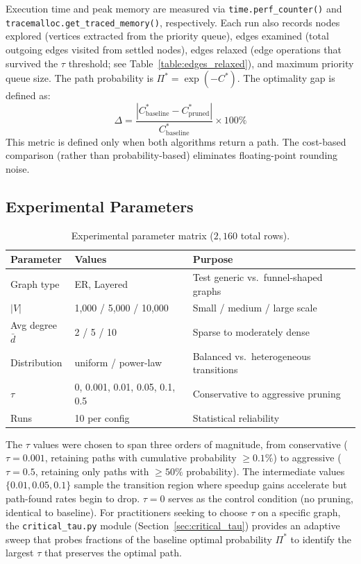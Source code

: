 Execution time and peak memory are measured via \texttt{time.perf\_counter()} and \texttt{tracemalloc.get\_traced\_memory()}, respectively.
Each run also records nodes explored (vertices extracted from the priority queue), edges examined (total outgoing edges visited from settled nodes), edges relaxed (edge operations that survived the $\tau$ threshold; see Table~\ref{table:edges_relaxed}), and maximum priority queue size.
The path probability is $\Pi^* = \exp(-C^*)$. The optimality gap is defined as:
    \[
    \Delta = \frac{|C^*_{\text{baseline}} - C^*_{\text{pruned}}|}{C^*_{\text{baseline}}} \times 100\%
    \]
    This metric is defined only when both algorithms return a path. The cost-based comparison (rather than probability-based) eliminates floating-point rounding noise.

\subsection{Experimental Parameters}

\begin{table}[htbp]
\centering
\renewcommand{\arraystretch}{1.3}
\begin{tabular}{@{}llp{7cm}@{}}
\toprule
\textbf{Parameter} & \textbf{Values} & \textbf{Purpose} \\
\midrule
Graph type & ER, Layered & Test generic vs.\ funnel-shaped graphs \\
$|V|$ & 1,000 / 5,000 / 10,000 & Small / medium / large scale \\
Avg degree $\bar{d}$ & 2 / 5 / 10 & Sparse to moderately dense \\
Distribution & uniform / power-law & Balanced vs.\ heterogeneous transitions \\
$\tau$ & 0, 0.001, 0.01, 0.05, 0.1, 0.5 & Conservative to aggressive pruning \\
Runs & 10 per config & Statistical reliability \\
\bottomrule
\end{tabular}
\caption[Experimental parameter matrix]{Experimental parameter matrix ($2{,}160$ total rows).}
\label{table:param_matrix}
\end{table}

The $\tau$ values were chosen to span three orders of magnitude, from conservative ($\tau = 0.001$, retaining paths with cumulative probability $\geq 0.1\%$) to aggressive ($\tau = 0.5$, retaining only paths with $\geq 50\%$ probability). The intermediate values $\{0.01, 0.05, 0.1\}$ sample the transition region where speedup gains accelerate but path-found rates begin to drop. $\tau = 0$ serves as the control condition (no pruning, identical to baseline). For practitioners seeking to choose $\tau$ on a specific graph, the \texttt{critical\_tau.py} module (Section~\ref{sec:critical_tau}) provides an adaptive sweep that probes fractions of the baseline optimal probability $\Pi^*$ to identify the largest $\tau$ that preserves the optimal path.

